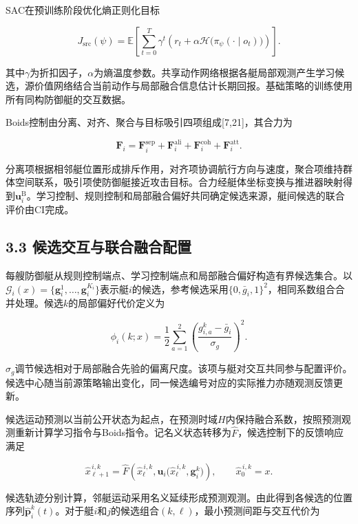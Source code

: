 \documentclass[
  11pt,
  fontset=none]{ctexart}
\begin{document}
SAC在预训练阶段优化熵正则化目标

\[
J_{\mathrm{src}}(\psi)
=\mathbb E\!\left[
\sum_{t=0}^{T}\gamma^t
\left(r_t+\alpha\mathcal H\bigl(\pi_\psi(\cdot\mid o_t)\bigr)\right)
\right] .
\tag{8}
\]

其中\(\gamma\)为折扣因子，\(\alpha\)为熵温度参数。共享动作网络根据各艇局部观测产生学习候选，源价值网络结合当前动作与局部融合信息估计长期回报。基础策略的训练使用所有同构防御艇的交互数据。

Boids控制由分离、对齐、聚合与目标吸引四项组成{[}7,21{]}，其合力为

\[
\boldsymbol F_i
=\boldsymbol F_i^{\mathrm{sep}}
+\boldsymbol F_i^{\mathrm{ali}}
+\boldsymbol F_i^{\mathrm{coh}}
+\boldsymbol F_i^{\mathrm{att}} .
\tag{9}
\]

分离项根据相邻艇位置形成排斥作用，对齐项协调航行方向与速度，聚合项维持群体空间联系，吸引项使防御艇接近攻击目标。合力经艇体坐标变换与推进器映射得到\(\boldsymbol u_i^{\mathrm B}\)。学习控制、规则控制和局部融合偏好共同确定候选来源，艇间候选的联合评价由CI完成。

\subsection{3.3
候选交互与联合融合配置}\label{ux5019ux9009ux4ea4ux4e92ux4e0eux8054ux5408ux878dux5408ux914dux7f6e}

每艘防御艇从规则控制端点、学习控制端点和局部融合偏好构造有界候选集合。以\(\mathcal G_i(x)=\{\boldsymbol g_i^1,\ldots,\boldsymbol g_i^{K_i}\}\)表示艇\(i\)的候选，参考候选采用\(\{0,\bar g_i,1\}^2\)，相同系数组合合并处理。候选\(k\)的局部偏好代价定义为

\[
\phi_i(k;x)
=\frac12\sum_{a=1}^{2}
\left(\frac{g_{i,a}^{k}-\bar g_i}{\sigma_g}\right)^2 .
\tag{10}
\]

\(\sigma_g\)调节候选相对于局部融合先验的偏离尺度。该项与艇对交互共同参与配置评价。候选中心随当前源策略输出变化，同一候选编号对应的实际推力亦随观测反馈更新。

候选运动预测以当前公开状态为起点，在预测时域\(H\)内保持融合系数，按照预测观测重新计算学习指令与Boids指令。记名义状态转移为\(\widehat F\)，候选控制下的反馈响应满足

\[
\widehat x_{\ell+1}^{\,i,k}
=\widehat F\!\left(
\widehat x_{\ell}^{\,i,k},
\boldsymbol u_i\bigl(\widehat x_{\ell}^{\,i,k},\boldsymbol g_i^k\bigr)
\right),
\qquad
\widehat x_0^{\,i,k}=x .
\tag{11}
\]

候选轨迹分别计算，邻艇运动采用名义延续形成预测观测。由此得到各候选的位置序列\(\widehat{\boldsymbol p}_i^k(t)\)。对于艇\(i\)和\(j\)的候选组合\((k,\ell)\)，最小预测间距与交互代价为
\end{document}
